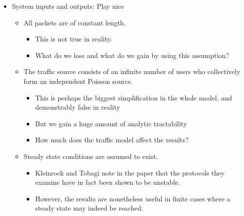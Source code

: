 \begin{itemize}[noitemsep]
\item System inputs and outputs: Play nice
  \begin{itemize}[noitemsep]
  \item All packets are of constant length.
    \begin{itemize}[noitemsep]
    \item This is not true in reality.
    \item What do we lose and what do we gain by using this assumption?
    \end{itemize}
  \item The traffic source consists of an infinite number of users who collectively form an independent Poisson source.
    \begin{itemize}[noitemsep]
    \item This is perhaps the biggest simplification in the whole model, and demonstrably false in reality
    \item But we gain a huge amount of analytic tractability
    \item How much does the traffic model affect the results?
    \end{itemize}

  \item Steady state conditions are assumed to exist.
    \begin{itemize}[noitemsep]
    \item Kleinrock and Tobagi note in the paper that the protocols they examine have in fact been shown to be unstable.
    \item However, the results are nonetheless useful in finite cases where a steady state may indeed be reached.
    \end{itemize}
  \end{itemize}
\end{itemize}

